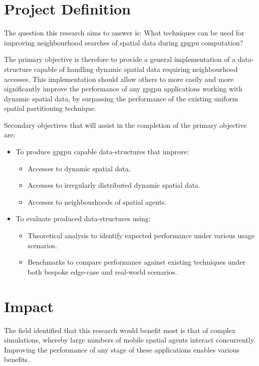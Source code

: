   \section{Project Definition}
    The question this research aims to answer is: What techniques can be used for improving neighbourhood searches of spatial data during \gls{gpgpu} computation? 
    
    The primary objective is therefore to provide a general implementation of a data-structure capable of handling dynamic spatial data requiring neighbourhood accesses. This implementation should allow others to more easily and more significantly improve the performance of any \gls{gpgpu} applications working with dynamic spatial data, by surpassing the performance of the existing uniform spatial partitioning technique.

    Secondary objectives that will assist in the completion of the primary objective are:
    \begin{itemize}
      \item To produce \gls{gpgpu} capable data-structures that improve:
      \begin{itemize}
        \item Accesses to dynamic spatial data.
        \item Accesses to irregularly distributed dynamic spatial data. 
        \item Accesses to neighbourhoods of spatial agents. 
      \end{itemize}
      \item To evaluate produced data-structures using:
      \begin{itemize}
        \item Theoretical analysis to identify expected performance under various usage scenarios.
        \item Benchmarks to compare performance against existing techniques under both bespoke edge-case and real-world scenarios.
      \end{itemize}
    \end{itemize}
    
  \section{Impact}
    The field identified that this research would benefit most is that of complex simulations, whereby large numbers of mobile spatial agents interact concurrently. Improving the performance of any stage of these applications enables various benefits.
     
